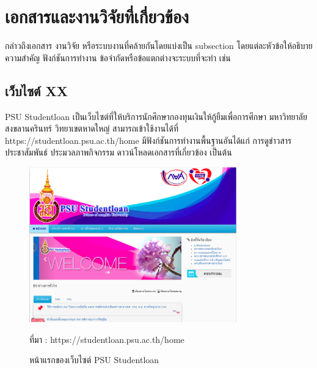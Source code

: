 	\section{เอกสารและงานวิจัยที่เกี่ยวข้อง}
		  กล่าวถึงเอกสาร งานวิจัย หรือระบบงานที่คล้ายกันโดยแบ่งเป็น subsection โดยแต่ละหัวข้อให้อธิบายความสำคัญ ฟังก์ชันการทำงาน ข้อจำกัดหรือข้อแตกต่างจะระบบที่จะทำ เช่น
		 \subsection{เว็บไซต์ XX}
		 PSU Studentloan \cite{PSU} เป็นเว็บไซต์ที่ให้บริการนักศึกษากองทุนเงินให้กู้ยืมเพื่อการศึกษา มหาวิทยาลัยสงขลานครินทร์ วิทยาเขตหาดใหญ่ สามารถเข้าใช้งานได้ที่ https://studentloan.psu.ac.th/home มีฟังก์ชันการทำงานพื้นฐานอันได้แก่ การดูข่าวสารประชาสัมพันธ์  ประมวลภาพกิจกรรม ดาวน์โหลดเอกสารที่เกี่ยวข้อง เป็นต้น
			 \begin{figure}[H]
			 	\centering
			 	\includegraphics[width=0.8\textwidth]{Figures/2/1}
			 	\caption{หน้าแรกของเว็บไซต์ PSU Studentloan}{ที่มา : https://studentloan.psu.ac.th/home}
			 	\label{Fig:Studentloan1}
			 \end{figure}
			 
